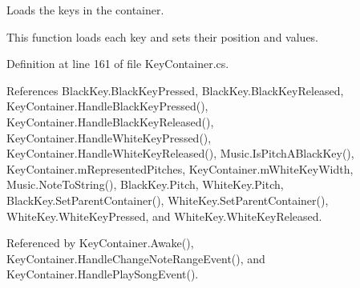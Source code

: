 Loads the keys in the container. 

This function loads each key and sets their position and values. 

Definition at line 161 of file Key\+Container.\+cs.



References Black\+Key.\+Black\+Key\+Pressed, Black\+Key.\+Black\+Key\+Released, Key\+Container.\+Handle\+Black\+Key\+Pressed(), Key\+Container.\+Handle\+Black\+Key\+Released(), Key\+Container.\+Handle\+White\+Key\+Pressed(), Key\+Container.\+Handle\+White\+Key\+Released(), Music.\+Is\+Pitch\+A\+Black\+Key(), Key\+Container.\+m\+Represented\+Pitches, Key\+Container.\+m\+White\+Key\+Width, Music.\+Note\+To\+String(), Black\+Key.\+Pitch, White\+Key.\+Pitch, Black\+Key.\+Set\+Parent\+Container(), White\+Key.\+Set\+Parent\+Container(), White\+Key.\+White\+Key\+Pressed, and White\+Key.\+White\+Key\+Released.



Referenced by Key\+Container.\+Awake(), Key\+Container.\+Handle\+Change\+Note\+Range\+Event(), and Key\+Container.\+Handle\+Play\+Song\+Event().


